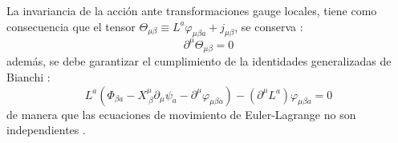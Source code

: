 \documentclass[a4paper,12pt]{article}
\begin{document}
La invariancia de la acción ante transformaciones gauge locales, tiene como consecuencia que el tensor $\Theta_{\mu\beta}\equiv L^a\varphi_{\mu\beta a}+j_{\mu\beta}$, se conserva \cite{vinculos}:
\begin{equation}
\partial^\mu \Theta_{\mu\beta}=0
\label{congaulo}
\end{equation}
además, se debe garantizar el cumplimiento de la identidades generalizadas de Bianchi \cite{vinculos}:
\begin{equation}
L^a(\Phi_{\beta a}-X_{\ \beta}^\mu\partial_\mu\psi_a-\partial^\mu\varphi_{\mu\beta a})-(\partial^\mu L^a)\varphi_{\mu\beta a}=0
\label{ibianchi}
\end{equation}
de manera que las ecuaciones de movimiento de Euler-Lagrange no son \mbox{independientes} \cite{vinculos}.
\\
\end{document}
